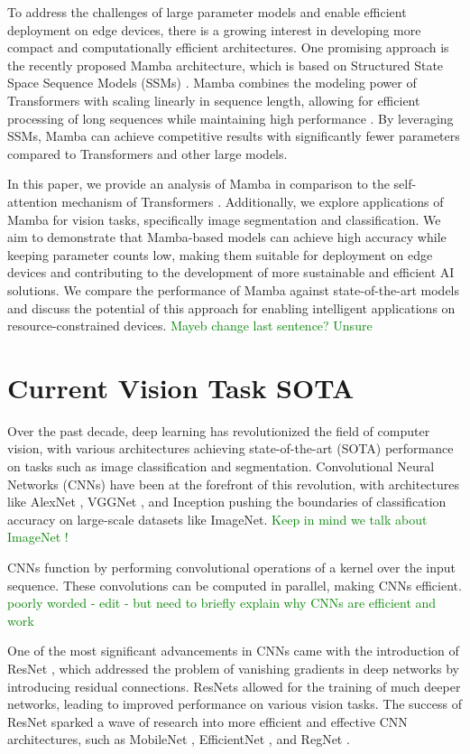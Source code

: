 \documentclass[conference]{IEEEtran}
\newcommand{\gr}[1]{\textcolor{green}{#1}}
\begin{document}
To address the challenges of large parameter models and enable efficient deployment on edge devices, there is a growing interest in developing more compact and computationally efficient architectures. One promising approach is the recently proposed Mamba architecture, which is based on Structured State Space Sequence Models (SSMs) \cite{gu2022efficiently}. Mamba combines the modeling power of Transformers with scaling linearly in sequence length, allowing for efficient processing of long sequences while maintaining high performance \cite{gu2023mamba}. By leveraging SSMs, Mamba can achieve competitive results with significantly fewer parameters compared to Transformers and other large models.

In this paper, we provide an analysis of Mamba in comparison to the self-attention mechanism of Transformers . Additionally, we explore applications of Mamba for vision tasks, specifically image segmentation and classification. We aim to demonstrate that Mamba-based models can achieve high accuracy while keeping parameter counts low, making them suitable for deployment on edge devices and contributing to the development of more sustainable and efficient AI solutions. We compare the performance of Mamba against state-of-the-art models and discuss the potential of this approach for enabling intelligent applications on resource-constrained devices. \gr{Mayeb change last sentence? Unsure}


\section{Current Vision Task SOTA}
Over the past decade, deep learning has revolutionized the field of computer vision, with various architectures achieving state-of-the-art (SOTA) performance on tasks such as image classification and segmentation. Convolutional Neural Networks (CNNs) have been at the forefront of this revolution, with architectures like AlexNet \cite{krizhevsky2012imagenet}, VGGNet \cite{simonyan2014very}, and Inception \cite{szegedy2015going} pushing the boundaries of classification accuracy on large-scale datasets like ImageNet. \gr{Keep in mind we talk about ImageNet !}

CNNs function by performing convolutional operations of a kernel over the input sequence. These convolutions can be computed in parallel, making CNNs efficient. \gr{poorly worded - edit -  but need to briefly explain why CNNs are efficient and work}

One of the most significant advancements in CNNs came with the introduction of ResNet \cite{he2016deep}, which addressed the problem of vanishing gradients in deep networks by introducing residual connections. ResNets allowed for the training of much deeper networks, leading to improved performance on various vision tasks. The success of ResNet sparked a wave of research into more efficient and effective CNN architectures, such as MobileNet \cite{howard2017mobilenets}, EfficientNet \cite{tan2019efficientnet}, and RegNet \cite{radosavovic2020designing}.
\end{document}
